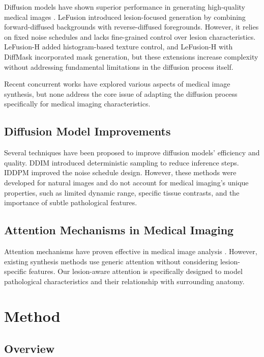 \documentclass[10pt,twocolumn,letterpaper]{article}
\begin{document}
Diffusion models have shown superior performance in generating high-quality medical images \cite{khader2023denoising}. LeFusion \cite{zhang2025lefusion} introduced lesion-focused generation by combining forward-diffused backgrounds with reverse-diffused foregrounds. However, it relies on fixed noise schedules and lacks fine-grained control over lesion characteristics. LeFusion-H added histogram-based texture control, and LeFusion-H with DiffMask incorporated mask generation, but these extensions increase complexity without addressing fundamental limitations in the diffusion process itself.

Recent concurrent works \cite{chen2024towards, lai2024pixel, wu2024freetumor} have explored various aspects of medical image synthesis, but none address the core issue of adapting the diffusion process specifically for medical imaging characteristics.

\subsection{Diffusion Model Improvements}

Several techniques have been proposed to improve diffusion models' efficiency and quality. DDIM \cite{song2020denoising} introduced deterministic sampling to reduce inference steps. IDDPM \cite{nichol2021improved} improved the noise schedule design. However, these methods were developed for natural images and do not account for medical imaging's unique properties, such as limited dynamic range, specific tissue contrasts, and the importance of subtle pathological features.

\subsection{Attention Mechanisms in Medical Imaging}

Attention mechanisms have proven effective in medical image analysis \cite{hatamizadeh2021swin}. However, existing synthesis methods use generic attention without considering lesion-specific features. Our lesion-aware attention is specifically designed to model pathological characteristics and their relationship with surrounding anatomy.

\section{Method}

\subsection{Overview}
\end{document}
